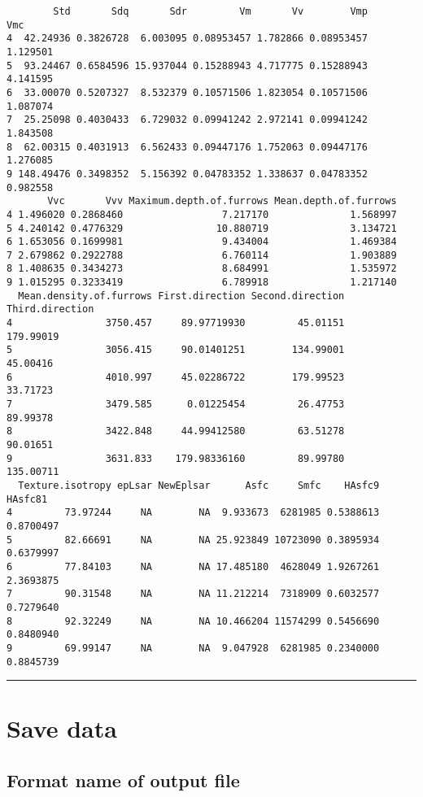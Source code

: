\documentclass[
]{article}
\begin{document}
\begin{verbatim}
        Std       Sdq       Sdr         Vm       Vv        Vmp      Vmc
4  42.24936 0.3826728  6.003095 0.08953457 1.782866 0.08953457 1.129501
5  93.24467 0.6584596 15.937044 0.15288943 4.717775 0.15288943 4.141595
6  33.00070 0.5207327  8.532379 0.10571506 1.823054 0.10571506 1.087074
7  25.25098 0.4030433  6.729032 0.09941242 2.972141 0.09941242 1.843508
8  62.00315 0.4031913  6.562433 0.09447176 1.752063 0.09447176 1.276085
9 148.49476 0.3498352  5.156392 0.04783352 1.338637 0.04783352 0.982558
       Vvc       Vvv Maximum.depth.of.furrows Mean.depth.of.furrows
4 1.496020 0.2868460                 7.217170              1.568997
5 4.240142 0.4776329                10.880719              3.134721
6 1.653056 0.1699981                 9.434004              1.469384
7 2.679862 0.2922788                 6.760114              1.903889
8 1.408635 0.3434273                 8.684991              1.535972
9 1.015295 0.3233419                 6.789918              1.217140
  Mean.density.of.furrows First.direction Second.direction Third.direction
4                3750.457     89.97719930         45.01151       179.99019
5                3056.415     90.01401251        134.99001        45.00416
6                4010.997     45.02286722        179.99523        33.71723
7                3479.585      0.01225454         26.47753        89.99378
8                3422.848     44.99412580         63.51278        90.01651
9                3631.833    179.98336160         89.99780       135.00711
  Texture.isotropy epLsar NewEplsar      Asfc     Smfc    HAsfc9   HAsfc81
4         73.97244     NA        NA  9.933673  6281985 0.5388613 0.8700497
5         82.66691     NA        NA 25.923849 10723090 0.3895934 0.6379997
6         77.84103     NA        NA 17.485180  4628049 1.9267261 2.3693875
7         90.31548     NA        NA 11.212214  7318909 0.6032577 0.7279640
8         92.32249     NA        NA 10.466204 11574299 0.5456690 0.8480940
9         69.99147     NA        NA  9.047928  6281985 0.2340000 0.8845739
\end{verbatim}

\begin{center}\rule{0.5\linewidth}{0.5pt}\end{center}

\hypertarget{save-data}{%
\section{Save data}\label{save-data}}

\hypertarget{format-name-of-output-file}{%
\subsection{Format name of output
file}\label{format-name-of-output-file}}
\end{document}
